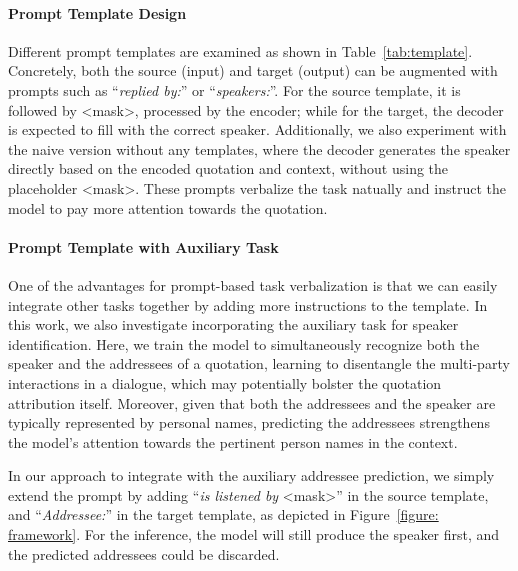 \documentclass[letterpaper]{article} %
\begin{document}
\paragraph{Prompt Template Design}
Different prompt templates are examined as shown in Table~\ref{tab:template}. Concretely, both the source (input) and target (output) can be augmented with prompts such as ``\textit{replied by:}'' or ``\textit{speakers:}''.
For the source template, it is followed by \textless mask\textgreater , processed by the encoder; while for the target, the decoder is expected to fill with the correct speaker. Additionally, we also experiment with the naive version without any templates, where the decoder generates the speaker directly based on the encoded quotation and context, without using the placeholder \textless mask\textgreater.
These prompts verbalize the task natually and instruct the model to pay more attention towards the quotation.




\paragraph{Prompt Template with Auxiliary Task}
One of the advantages for prompt-based task verbalization is that we can easily integrate other tasks together by adding more instructions to the template.
In this work, we also investigate incorporating the auxiliary task for speaker identification. Here, we train the model to simultaneously recognize both the speaker and the addressees of a quotation, learning to disentangle the multi-party interactions in a dialogue, which may potentially bolster the quotation attribution itself. Moreover, given that both the addressees and the speaker are typically represented by personal names, predicting the addressees strengthens the model's attention towards the pertinent person names in the context.


In our approach to integrate with the auxiliary addressee prediction, we simply extend the prompt by adding ``\textit{is listened by} \textless mask\textgreater'' in the source template, and ``\textit{Addressee:}'' in the target template, as depicted in Figure~\ref{figure: framework}.
For the inference, the model will still produce the speaker first, and the predicted addressees could be discarded.
\end{document}
